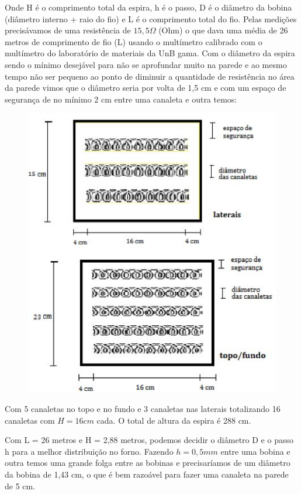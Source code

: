 Onde H é o comprimento total da espira, h é o passo, D é o diâmetro da bobina (diâmetro interno + raio do fio) e L é o comprimento total do fio.
Pelas medições precisávamos de uma resistência de $15,5\Omega$ (Ohm) o que dava uma média de 26 metros de comprimento de fio (L) usando o multímetro calibrado com o multímetro do laboratório de materiais da UnB gama.
Com o diâmetro da espira sendo o mínimo desejável para não se aprofundar muito na parede e ao mesmo tempo não ser pequeno ao ponto de diminuir a quantidade de resistência no área da parede vimos que o diâmetro seria por volta de 1,5 cm e com um espaço de segurança de no mínimo 2 cm entre uma canaleta e outra temos:
\begin{figure}[ht]
	\centering
	\label{resistencia2}
	\includegraphics[keepaspectratio=true,scale=1.0]{figuras/alimentacao4.JPG}
\end{figure}

Com 5 canaletas no topo e no fundo e 3 canaletas nas laterais totalizando 16 canaletas com $H=16 cm$ cada. O total de altura da espira é 288 cm.

Com L = 26 metros e H = 2,88 metros, podemos decidir o diâmetro D e o passo h para a melhor distribuição no forno. Fazendo $h = 0,5 mm$ entre uma bobina e outra temos uma grande folga entre as bobinas e precisaríamos de um diâmetro da bobina de 1,43 cm, o que é bem razoável para fazer uma canaleta na parede de 5 cm.

